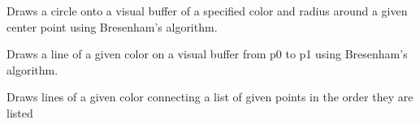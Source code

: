 \documentclass[letterpaper,10pt,english,openany,oneside]{sphinxmanual}
\begin{document}
\begin{fulllineitems}

\pysigstartsignatures
{}
\pysigstopsignatures
\sphinxAtStartPar
Draws a circle onto a visual buffer of a specified color and radius
around a given center point using Bresenham’s algorithm.

\end{fulllineitems}



\begin{fulllineitems}

\pysigstartsignatures
{}
\pysigstopsignatures
\sphinxAtStartPar
Draws a line of a given color on a visual buffer from p0 to p1 using
Bresenham’s algorithm.

\end{fulllineitems}



\begin{fulllineitems}

\pysigstartsignatures
{}
\pysigstopsignatures
\sphinxAtStartPar
Draws lines of a given color connecting a list of given points in the
order they are listed

\end{fulllineitems}
\end{document}
